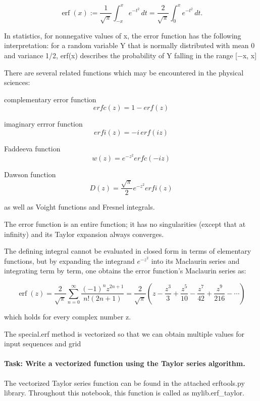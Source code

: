 \documentclass[11pt]{article}
\begin{document}
\[\operatorname {erf} (x) :={\frac {1}{\sqrt {\pi }}}\int _{-x}^{x}e^{-t^{2}}\,dt ={\frac {2}{\sqrt {\pi }}}\int _{0}^{x}e^{-t^{2}}\,dt. \]

In statistics, for nonnegative values of x, the error function has the
following interpretation: for a random variable Y that is normally
distributed with mean 0 and variance 1/2, erf(x) describes the
probability of Y falling in the range {[}−x, x{]}

There are several related functions which may be encountered in the
physical sciences:

complementary error function \[erfc(z) = 1 - erf(z) \]

imaginary errror function \[erfi(z) = -i \, erf(iz) \]

Faddeeva function \[w(z) = e^{-z^2} erfc(-iz)\]

Dawson function\\
\[D(z) = \frac{\sqrt \pi}{2} e^{-z^2} erfi(z)\]

as well as Voight functions and Fresnel integrals.

    The error function is an entire function; it has no singularities
(except that at infinity) and its Taylor expansion always converges.

The defining integral cannot be evaluated in closed form in terms of
elementary functions, but by expanding the integrand \(e^{−z^2}\) into
its Maclaurin series and integrating term by term, one obtains the error
function's Maclaurin series as:

\[ \operatorname {erf} (z)={\frac {2}{\sqrt {\pi }}}\sum _{n=0}^{\infty }{\frac {(-1)^{n}z^{2n+1}}{n!(2n+1)}}={\frac {2}{\sqrt {\pi }}}\left(z-{\frac {z^{3}}{3}}+{\frac {z^{5}}{10}}-{\frac {z^{7}}{42}}+{\frac {z^{9}}{216}}-\cdots \right) \]

which holds for every complex number z.

    The special.erf method is vectorized so that we can obtain multiple
values for input sequences and grid

\hypertarget{task-write-a-vectorized-function-using-the-taylor-series-algorithm.}{%
\paragraph{Task: Write a vectorized function using the Taylor series
algorithm.}\label{task-write-a-vectorized-function-using-the-taylor-series-algorithm.}}

    The vectorized Taylor series function can be found in the attached
erftools.py library. Throughout this notebook, this function is called
as mylib.erf\_taylor.
\end{document}
